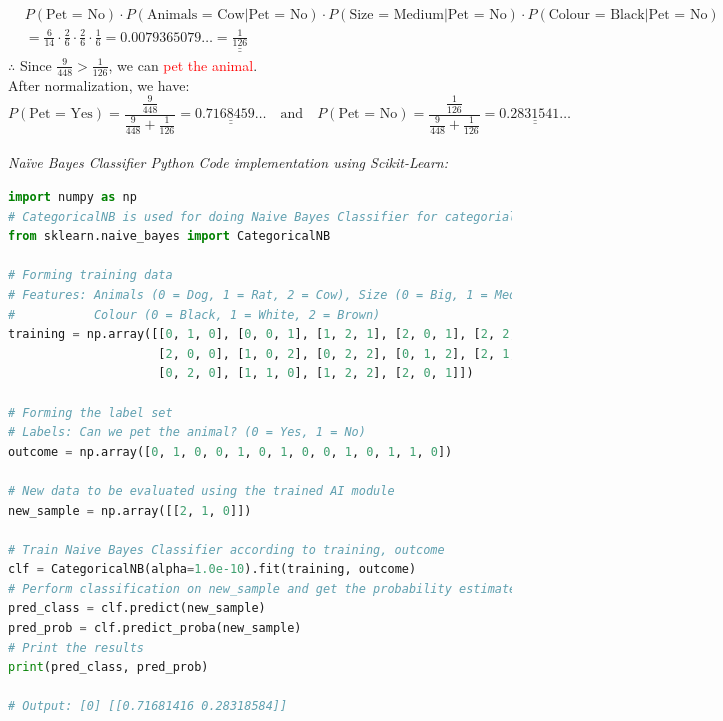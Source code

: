 \documentclass{book}
\begin{document}
\begin{align*}
    & P({\text{Pet = No}}) \cdot P({\text{Animals = Cow}}|{\text{Pet = No}}) \cdot P({\text{Size = Medium}}|{\text{Pet = No}}) \cdot P({\text{Colour = Black}}|{\text{Pet = No}}) \\
    & = \frac{6}{14} \cdot \frac{2}{6} \cdot \frac{2}{6} \cdot \frac{1}{6} = 0.0079365079\ldots = \underline{\underline{\frac{1}{126}}}
\end{align*}
$\therefore$ Since \(\frac{9}{448} > \frac{1}{126}\), we can \textcolor{red}{pet the animal}.\\
After normalization, we have:
\[
    P({\text{Pet = Yes}}) = \frac{\frac{9}{448}}{\frac{9}{448} + \frac{1}{126}} = \underline{\underline{0.7168459\ldots}} \quad \text{and} \quad P({\text{Pet = No}}) = \frac{\frac{1}{126}}{\frac{9}{448} + \frac{1}{126}} = \underline{\underline{0.2831541\ldots}}
\]\\
\textit{\large{Naïve Bayes Classifier Python Code implementation using Scikit-Learn:}}
\begin{lstlisting}[language=Python, basicstyle=\ttfamily\small, keywordstyle=\color{blue}, commentstyle=\color{forestgreen}, stringstyle=\color{red}]
import numpy as np
# CategoricalNB is used for doing Naive Bayes Classifier for categorial features
from sklearn.naive_bayes import CategoricalNB

# Forming training data
# Features: Animals (0 = Dog, 1 = Rat, 2 = Cow), Size (0 = Big, 1 = Medium, 2 = Small),
#           Colour (0 = Black, 1 = White, 2 = Brown)
training = np.array([[0, 1, 0], [0, 0, 1], [1, 2, 1], [2, 0, 1], [2, 2, 2],
                     [2, 0, 0], [1, 0, 2], [0, 2, 2], [0, 1, 2], [2, 1, 1],
                     [0, 2, 0], [1, 1, 0], [1, 2, 2], [2, 0, 1]])

# Forming the label set
# Labels: Can we pet the animal? (0 = Yes, 1 = No)
outcome = np.array([0, 1, 0, 0, 1, 0, 1, 0, 0, 1, 0, 1, 1, 0])

# New data to be evaluated using the trained AI module
new_sample = np.array([[2, 1, 0]])

# Train Naive Bayes Classifier according to training, outcome
clf = CategoricalNB(alpha=1.0e-10).fit(training, outcome)
# Perform classification on new_sample and get the probability estimated
pred_class = clf.predict(new_sample)
pred_prob = clf.predict_proba(new_sample)
# Print the results
print(pred_class, pred_prob)

# Output: [0] [[0.71681416 0.28318584]]
\end{lstlisting}
\newpage
\end{document}
